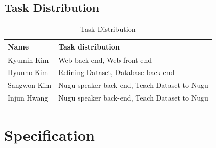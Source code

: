 \documentclass[conference]{IEEEtran}
\begin{document}
\subsection{Task Distribution}

\begin{table}[htbp]
  \renewcommand{\arraystretch}{1.5}
\caption{Task Distribution}
\begin{center}
\begin{tabular}{|p{2cm}|p{5cm}|}
\hline
\textbf{Name} & \textbf{Task distribution}\\
\hline
Kyumin Kim & Web back-end, Web front-end \\
\hline
Hyunho Kim & Refining Dataset, Database back-end \\
\hline
Sangwon Kim & Nugu speaker back-end, Teach Dataset to Nugu\\
\hline
Injun Hwang & Nugu speaker back-end, Teach Dataset to Nugu\\
\hline

\end{tabular}
\label{tab2}
\end{center}
\end{table}
 
\section{Specification}
\end{document}
